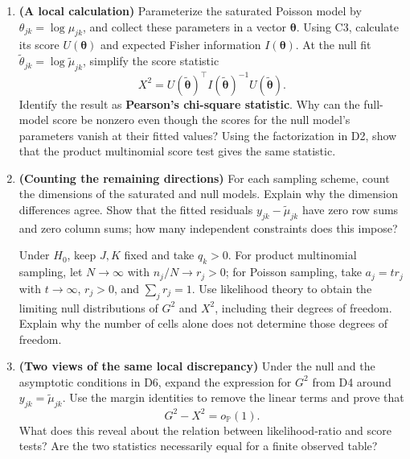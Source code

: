 \begin{enumerate}[label=\textcolor{AccentInk}{\sffamily\bfseries D\arabic*.},
                  ref=D\arabic*,leftmargin=2.65em,labelsep=0.65em,itemsep=1em]
\item \textbf{(A local calculation)}
Parameterize the saturated Poisson model by
$\theta_{jk}=\log\mu_{jk}$, and collect these parameters in a vector
$\boldsymbol\theta$. Using C3, calculate its score
$U(\boldsymbol\theta)$ and expected Fisher information
$I(\boldsymbol\theta)$. At the null fit
$\widetilde\theta_{jk}=\log\widetilde\mu_{jk}$, simplify the score statistic
\[
    X^2=U(\widetilde{\boldsymbol\theta})^\top
        I(\widetilde{\boldsymbol\theta})^{-1}
        U(\widetilde{\boldsymbol\theta}).
\]
Identify the result as \textbf{Pearson's chi-square statistic}.
Why can the full-model score be nonzero even though the scores for the null
model's parameters vanish at their fitted values? Using the factorization
in D2, show that the product multinomial score test gives the same statistic.

\item \textbf{(Counting the remaining directions)}
For each sampling scheme, count the dimensions of the saturated and null
models. Explain why the dimension differences agree. Show that the fitted
residuals $y_{jk}-\widetilde\mu_{jk}$ have zero row sums and zero column sums;
how many independent constraints does this impose?

Under $H_0$, keep $J,K$ fixed and take $q_k>0$. For product multinomial
sampling, let $N\to\infty$ with $n_j/N\to r_j>0$; for Poisson sampling,
take $a_j=t r_j$ with $t\to\infty$, $r_j>0$, and $\sum_jr_j=1$.
Use likelihood theory to obtain the limiting null distributions of $G^2$
and $X^2$, including their degrees of freedom. Explain why the number of
cells alone does not determine those degrees of freedom.

\item \textbf{(Two views of the same local discrepancy)}
Under the null and the asymptotic conditions in D6, expand the expression
for $G^2$ from D4 around $y_{jk}=\widetilde\mu_{jk}$. Use the margin
identities to remove the linear terms and prove that
\[
    G^2-X^2=o_{\mathbb P}(1).
\]
What does this reveal about the relation between likelihood-ratio and score
tests? Are the two statistics necessarily equal for a finite observed table?
\end{enumerate}

